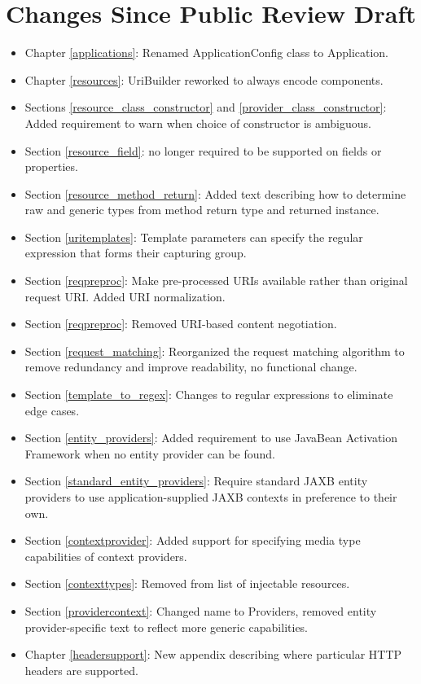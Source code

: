 \section{Changes Since Public Review Draft}

\begin{itemize}
\item Chapter \ref{applications}: Renamed ApplicationConfig class to Application.
\item Chapter \ref{resources}: UriBuilder reworked to always encode components.
\item Sections \ref{resource_class_constructor} and \ref{provider_class_constructor}: Added requirement to warn when choice of constructor is ambiguous.
\item Section \ref{resource_field}:  no longer required to be supported on fields or properties.
\item Section \ref{resource_method_return}: Added text describing how to determine raw and generic types from method return type and returned instance.
\item Section \ref{uritemplates}: Template parameters can specify the regular expression that forms their capturing group.
\item Section \ref{reqpreproc}: Make pre-processed URIs available rather than original request URI. Added URI normalization.
\item Section \ref{reqpreproc}: Removed URI-based content negotiation.
\item Section \ref{request_matching}: Reorganized the request matching algorithm to remove redundancy and improve readability, no functional change.
\item Section \ref{template_to_regex}: Changes to regular expressions to eliminate edge cases.
\item Section \ref{entity_providers}: Added requirement to use JavaBean Activation Framework when no entity provider can be found.
\item Section \ref{standard_entity_providers}: Require standard JAXB entity providers to use application-supplied JAXB contexts in preference to their own.
\item Section \ref{contextprovider}: Added support for specifying media type capabilities of context providers.
\item Section \ref{contexttypes}: Removed  from list of injectable resources.
\item Section \ref{providercontext}: Changed name to Providers, removed entity provider-specific text to reflect more generic capabilities.
\item Chapter \ref{headersupport}: New appendix describing where particular HTTP headers are supported.
\end{itemize}
